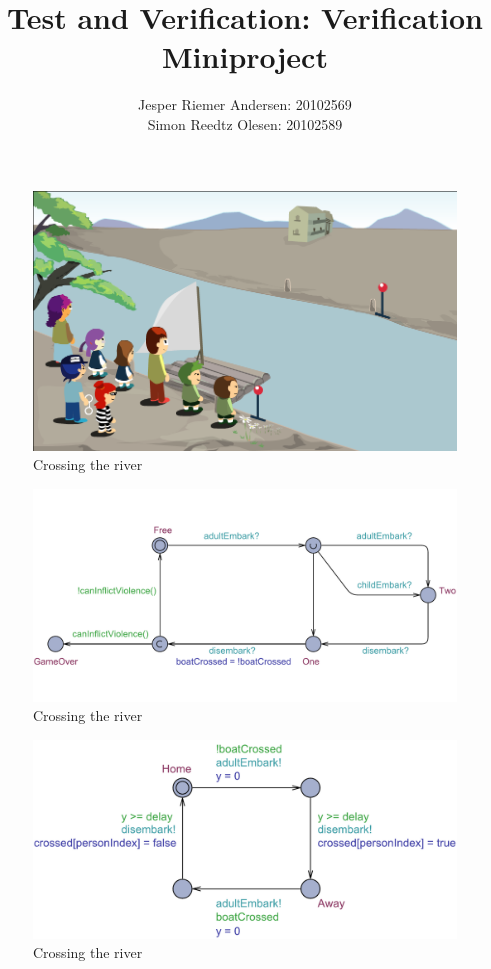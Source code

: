 \documentclass[a4paper,12pt]{article}
\title{Test and Verification: Verification Miniproject}
\author{Jesper Riemer Andersen: 20102569\\Simon Reedtz Olesen: 20102589}
\begin{document}
\maketitle

\begin{figure}[H]
\centering
\includegraphics[width=0.8\linewidth]{Crossing_The_River.png}
\caption{Crossing the river}
\end{figure}

\begin{figure}[H]
\centering
\includegraphics[width=\linewidth]{Boat.pdf}
\caption{Crossing the river}
\end{figure}

\begin{figure}[H]
\centering
\includegraphics[width=\linewidth]{Adult.pdf}
\caption{Crossing the river}
\end{figure}
\end{document}
